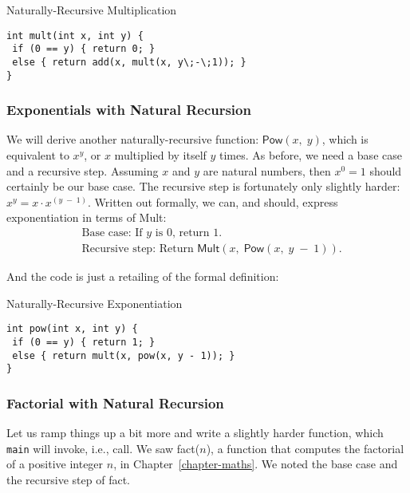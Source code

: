 \begin{cl}[main.c]{Naturally-Recursive Multiplication}
\begin{lstlisting}[language=MyC]
int mult(int x, int y) { 
 if (0 == y) { return 0; }
 else { return add(x, mult(x, y\;-\;1)); }
}
\end{lstlisting}
\end{cl}

\subsubsection*{Exponentials with Natural Recursion}

We will derive another naturally-recursive function: $\textsf{Pow}(x,\;y)$, which is equivalent to $x^y$, or $x$ multiplied by itself $y$ times. As before, we need a base case and a recursive step. Assuming $x$ and $y$ are natural numbers, then $x^0=1$ should certainly be our base case. The recursive step is fortunately only slightly harder: $x^y = x \cdot x^{(y\;-\;1)}$. Written out formally, we can, and should, express exponentiation in terms of \textsf{Mult}:
\begin{align*}
    &\text{Base case: If }y\text{ is }0\text{, return 1.}\\
    &\text{Recursive step: Return }\textsf{Mult}(x,\;\textsf{Pow}(x,\;y\;-\;1)).
\end{align*}

\noindent And the code is just a retailing of the formal definition:

\begin{cl}[main.c]{Naturally-Recursive Exponentiation}
\begin{lstlisting}[language=MyC]
int pow(int x, int y) {
 if (0 == y) { return 1; }
 else { return mult(x, pow(x, y - 1)); }
}
\end{lstlisting}
\end{cl}

\subsubsection*{Factorial with Natural Recursion}

Let us ramp things up a bit more and write a slightly harder function, which \texttt{main} will invoke, i.e., call. We saw \textsf{fact($n$)}, a function that computes the factorial of a positive integer $n$, in Chapter~\ref{chapter-maths}. We noted the base case and the recursive step of \textsf{fact}.

